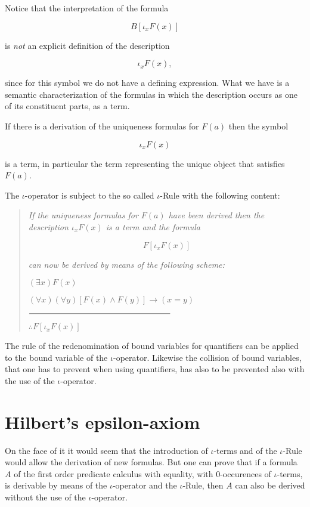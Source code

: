 \documentclass[12pt]{article}
\begin{document}
Notice that the interpretation of the formula

$$B [\iota_{x} F (x)]$$

is \emph{not} an explicit definition of the description 

$$\iota_{x} F (x),$$

since for this symbol we do not have a defining expression. What we have is a semantic characterization of the formulas in which the description occurs as one of its constituent parts, as a term.

If there is a derivation of the uniqueness formulas for $F (a)$ then the symbol 

$$\iota_{x} F (x)$$ 

is a term, in particular the term representing the unique object that satisfies $F (a)$.

The $\iota$-operator is subject to the so called $\iota$-Rule with the following content:

\begin{quotation}
\emph{If the uniqueness formulas for $F (a)$ have been derived then the description $\iota_{x} F (x)$ is a term and the formula}

$$F [\iota_x F (x)]$$ 

\emph{can now be derived by means of the following scheme:}

\qquad \qquad \qquad \qquad \qquad \qquad \qquad \qquad $(\exists x) F (x)$
 
\qquad \qquad \qquad \qquad \qquad \qquad \qquad \qquad $(\forall x) (\forall y) {[F (x) \wedge F (y)] \to (x = y)}$
     
\qquad \qquad \qquad \qquad \qquad \qquad \qquad \qquad $\line(1,0){170}$              

\qquad \qquad \qquad \qquad \qquad \qquad \qquad \qquad $\therefore F [\iota_{x} F (x)]$ 
\end{quotation}

The rule of the redenomination of bound variables for quantifiers can be applied to the bound variable of the $\iota$-operator. Likewise the collision of bound variables, that one has to prevent when using quantifiers, has also  to be prevented also with the use of the $\iota$-operator.

\section{Hilbert's epsilon-axiom}\normalsize

On the face of it it would seem that the introduction of $\iota$-terms and of the $\iota$-Rule would allow the derivation of new formulas. But one can prove that if a formula $A$ of the first order predicate calculus with equality, with 0-occurences of $\iota$-terms, is derivable by means of the $\iota$-operator and the $\iota$-Rule, then $A$ can also be derived without the use of the $\iota$-operator.
\end{document}
